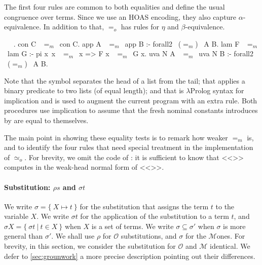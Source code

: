 \documentclass[sigconf,natbib=false,review]{acmart}
\newcommand{\EqualRel}{\ensuremath{=}}
\newcommand{\UnifRel}{\ensuremath{\simeq}}
\newcommand{\Uo}{\texorpdfstring{\ensuremath{\UnifRel_o}\xspace}{unif\_o}}
\newcommand{\Eo}{\ensuremath{\EqualRel_o}\xspace}
\newcommand{\Ee}{\ensuremath{\EqualRel_m}\xspace}
\newcommand{\Fo}{\texorpdfstring{\ensuremath{\mathcal{O}}\xspace}{O}}
\newcommand{\Ho}{\texorpdfstring{\ensuremath{\mathcal{M}}\xspace}{M}}
\begin{document}
The first four rules are common to both equalities
and define the usual congruence over terms. Since
we use an HOAS encoding, they also capture $\alpha$-equivalence.
In addition to that, \Eo has rules for $\eta$ and $\beta$-equivalence.



\begin{elpicode}
  ~ \PYG{n+nf}{(\Ee)} ~.
  con C ~\Ee~con C.
  app A ~\Ee~app B :- forall2 ~(\Ee)~ A B.
  lam F ~\Ee~lam G :- pi x\ x ~\Ee~x => F x ~\Ee~G x.
  uva N A ~\Ee~uva N B :- forall2 ~(\Ee)~ A B.
\end{elpicode}

\noindent
Note that the symbol \elpiIn{|} separates the head of a list from the tail;
that  applies a binary predicate to two lists (of equal
length); and that \elpiIn{=>} is $\lambda$Prolog syntax for
implication and is used to augment the
current program with an extra rule. Both procedures use implication to
assume that the fresh nominal constants introduces by  are
equal to themselves.

The main point in showing these equality tests is to remark how
weaker \Ee is, and to identify the four rules that need special
treatment in the implementation of \Uo.
For brevity, we omit the code of :
it is sufficient to know that <<>> computes in  the
weak-head normal form of <<>>.

\paragraph{Substitution: $\rho s$ and $\sigma t$}

We write $\sigma = \{~ X \mapsto t ~\}$ for the substitution that assigns
the term $t$ to the variable $X$.
We write $\sigma t$ for the application of
the substitution to a term $t$, and $\sigma X = \{~ \sigma t ~|~ t \in X ~\}$ when
$X$ is a set of terms.
We write $\sigma \subseteq \sigma'$ when $\sigma$ is more
general than $\sigma'$.
We shall use $\rho$ for \Fo{} substitutions,
and $\sigma$ for the \Ho ones.
For brevity, in this section, we consider
the substitution for \Fo{} and \Ho{} identical.
We defer to \cref{sec:grounwork} a more precise description
pointing out their differences.
\end{document}
